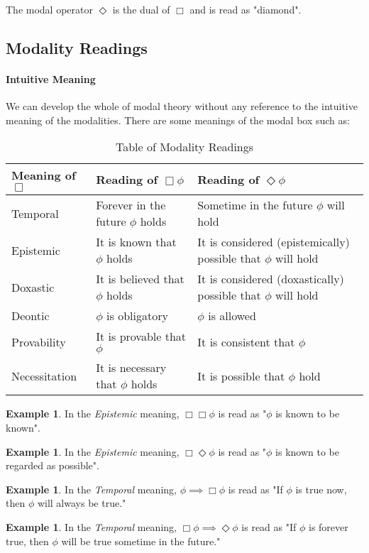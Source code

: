 \documentclass{article}
\theoremstyle{plain}
\theoremstyle{definition}
\newtheorem{exmp}[thm]{Example} %
\begin{document}
\begin{multicols}{2}
\noindent The modal operator $\Diamond$ is the dual of $\Box$ and is read as "diamond".

\subsection{Modality Readings}

\paragraph{Intuitive Meaning} We can develop the whole of modal theory without any reference to the intuitive meaning of the modalities. There are some meanings of the modal box such as:

\medskip 
\noindent
\begin{table}[H]
\bgroup
\def\arraystretch{1.5}\footnotesize
\begin{tabular}{ | p{2cm} || p{2.4cm} | p{2.4cm} | }
\hline
\bf Meaning of $\Box$ & \bf Reading of $\Box\phi$ & \bf Reading of $\Diamond\phi$ \\
\hline
\hline

Temporal & Forever in the future $\phi$ holds & Sometime in the future $\phi$ will hold \\
\hline

Epistemic & It is known that $\phi$ holds & It is considered (epistemically) possible that $\phi$ will hold \\
\hline

Doxastic & It is believed that $\phi$ holds & It is considered (doxastically) possible that $\phi$ will hold \\
\hline

Deontic & $\phi$ is obligatory & $\phi$ is allowed \\
\hline

Provability & It is provable that $\phi$ & It is consistent that $\phi$ \\
\hline

Necessitation & It is necessary that $\phi$ holds & It is possible that $\phi$ hold \\
\hline

\end{tabular}
\egroup
\caption{Table of Modality Readings}
\end{table}

\begin{exmp}In the \textit{Epistemic} meaning, $\Box\Box\phi$ is read as "$\phi$ is known to be known".\end{exmp}
\begin{exmp}In the \textit{Epistemic} meaning, $\Box\Diamond\phi$ is read as "$\phi$ is known to be regarded as possible".\end{exmp}
\begin{exmp}In the \textit{Temporal} meaning, $\phi \implies \Box\phi$ is read as "If $\phi$ is true now, then $\phi$ will always be true."\end{exmp}
\begin{exmp}In the \textit{Temporal} meaning, $\Box\phi \implies \Diamond\phi$ is read as "If $\phi$ is forever true, then $\phi$ will be true sometime in the future." \end{exmp}


\end{multicols}
\end{document}
